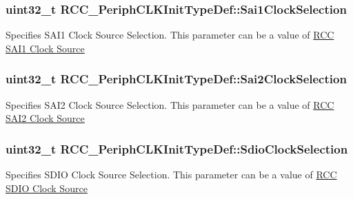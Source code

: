 \subsubsection[{\texorpdfstring{Sai1\+Clock\+Selection}{Sai1ClockSelection}}]{\setlength{\rightskip}{0pt plus 5cm}uint32\+\_\+t R\+C\+C\+\_\+\+Periph\+C\+L\+K\+Init\+Type\+Def\+::\+Sai1\+Clock\+Selection}\hypertarget{struct_r_c_c___periph_c_l_k_init_type_def_adc2a83ae9e108a3f7afb01c58f3a4f1a}{}\label{struct_r_c_c___periph_c_l_k_init_type_def_adc2a83ae9e108a3f7afb01c58f3a4f1a}
Specifies S\+A\+I1 Clock Source Selection. This parameter can be a value of \hyperlink{group___r_c_c_ex___s_a_i1___clock___source}{R\+CC S\+A\+I1 Clock Source} 
\subsubsection[{\texorpdfstring{Sai2\+Clock\+Selection}{Sai2ClockSelection}}]{\setlength{\rightskip}{0pt plus 5cm}uint32\+\_\+t R\+C\+C\+\_\+\+Periph\+C\+L\+K\+Init\+Type\+Def\+::\+Sai2\+Clock\+Selection}\hypertarget{struct_r_c_c___periph_c_l_k_init_type_def_a16f7cf65806df3589a4bab521315d8df}{}\label{struct_r_c_c___periph_c_l_k_init_type_def_a16f7cf65806df3589a4bab521315d8df}
Specifies S\+A\+I2 Clock Source Selection. This parameter can be a value of \hyperlink{group___r_c_c_ex___s_a_i2___clock___source}{R\+CC S\+A\+I2 Clock Source} 
\subsubsection[{\texorpdfstring{Sdio\+Clock\+Selection}{SdioClockSelection}}]{\setlength{\rightskip}{0pt plus 5cm}uint32\+\_\+t R\+C\+C\+\_\+\+Periph\+C\+L\+K\+Init\+Type\+Def\+::\+Sdio\+Clock\+Selection}\hypertarget{struct_r_c_c___periph_c_l_k_init_type_def_ac5260f32f4287234dec14829033f1652}{}\label{struct_r_c_c___periph_c_l_k_init_type_def_ac5260f32f4287234dec14829033f1652}
Specifies S\+D\+IO Clock Source Selection. This parameter can be a value of \hyperlink{group___r_c_c_ex___s_d_i_o___clock___source}{R\+CC S\+D\+IO Clock Source} 
